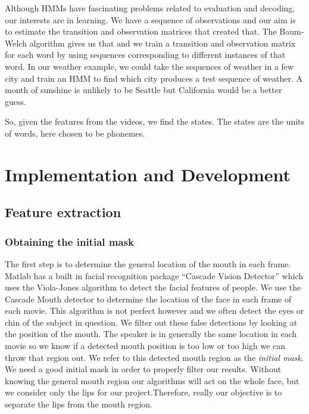 \documentclass[a4paper]{article}
\begin{document}
Although HMMs have fascinating problems related to evaluation and decoding, our interests are in learning. We have a sequence of observations and our aim is to estimate the transition and observation matrices that created that. The Baum-Welch algorithm \cite{key-3} gives us that and we train a transition and observation matrix for each word by using sequences corresponding to different instances of that word. In our weather example, we could take the sequences of weather in a few city and train an HMM to find which city produces a test sequence of weather. A month of sunshine is unlikely to be Seattle but California would be a better guess.

So, given the features from the videos, we find the states. The states are the units of words, here chosen to be phonemes. 
\section{Implementation and Development}

\subsection{Feature extraction}

\subsubsection{Obtaining the initial mask}
The first step is to determine the general location of the mouth in each frame. Matlab has a built in facial recognition package ``Cascade Vision Detector'' which uses the Viola-Jones algorithm to detect the facial features of people. We use the Cascade Mouth detector to determine the location of the face in each frame of each movie. This algorithm is not perfect however and we often detect the eyes or chin of the subject in question. We filter out these false detections by looking at the position of the mouth. The speaker is in generally the same location in each movie so we know if a detected mouth position is too low or too high we can throw that region out. We refer to this detected mouth region as the \textit{initial mask}. We need a good initial mask in order to properly filter our results. Without knowing the general mouth region our algorithms will act on the whole face, but we consider only the lips for our project.Therefore, really our objective is to separate the lips from the mouth region.\par
\end{document}
